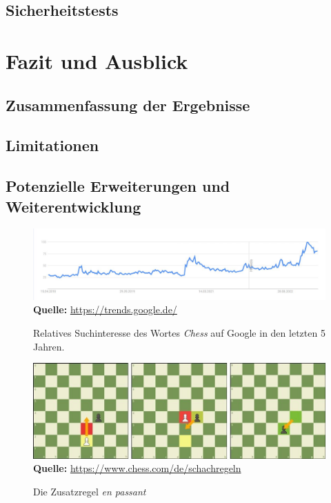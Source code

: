 \documentclass[a4paper,12pt]{report}
\begin{document}
    \section{Sicherheitstests}

\chapter{Fazit und Ausblick}
    \section{Zusammenfassung der Ergebnisse}
    \section{Limitationen}
    \section{Potenzielle Erweiterungen und Weiterentwicklung}

\appendix

\listoffigures
\begin{figure}[ht]
\raggedleft
  \includegraphics[width=160mm]{Schachentwicklung.jpg}
    \footnotesize\sffamily\textbf{Quelle:} \url{https://trends.google.de/}
  \caption{Relatives Suchinteresse des Wortes \textit{Chess} auf Google in den letzten 5 Jahren.}
  \label{fig:Schachinteresse}
\end{figure}
  
  \begin{figure}[ht]
\raggedleft
  \includegraphics[width=160mm]{en-passant.jpeg}
    \footnotesize\sffamily\textbf{Quelle:} \url{https://www.chess.com/de/schachregeln}
  \caption{Die Zusatzregel \textit{en passant}}
  \label{fig:en-passant}
\end{figure}
\end{document}
